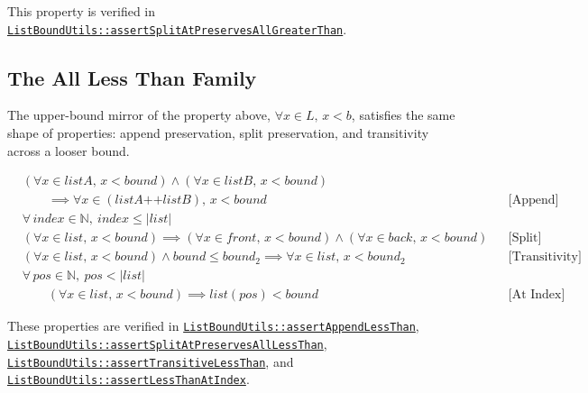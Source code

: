 {\raggedright
This property is verified in
\href{https://github.com/thiagomata/prime-numbers/blob/list-article-v1.0.0/src/main/scala/v1/chapter3/list/ListBoundUtils.scala}{\texttt{ListBoundUtils::\allowbreak assertSplitAtPreservesAllGreaterThan}}.
\par}

\subsection{The All Less Than Family}

The upper-bound mirror of the property above, $\forall x \in L,\, x < b$,
satisfies the same shape of properties: append preservation, split
preservation, and transitivity across a looser bound.

\begin{equation*}
\begin{aligned}
&(\forall x \in listA,\, x < bound) \wedge (\forall x \in listB,\, x < bound) \\
&\qquad \implies \forall x \in (listA \mathbin{\texttt{++}} listB),\, x < bound
  &&\text{[Append]} \\
&\forall\, index \in \mathbb{N},\ index \leq |list| \\
&(\forall x \in list,\, x < bound)
  \implies (\forall x \in front,\, x < bound)
     \wedge (\forall x \in back,\, x < bound)
  &&\text{[Split]} \\
&(\forall x \in list,\, x < bound) \wedge bound \leq bound_2
  \implies \forall x \in list,\, x < bound_2
  &&\text{[Transitivity]} \\
&\forall\, pos \in \mathbb{N},\ pos < |list| \\
&\qquad (\forall x \in list,\, x < bound)
  \implies list(pos) < bound
  &&\text{[At Index]}
\end{aligned}
\end{equation*}

{\raggedright
These properties are verified in
\href{https://github.com/thiagomata/prime-numbers/blob/list-article-v1.0.0/src/main/scala/v1/chapter3/list/ListBoundUtils.scala}{\texttt{ListBoundUtils::\allowbreak assertAppendLessThan}},
\href{https://github.com/thiagomata/prime-numbers/blob/list-article-v1.0.0/src/main/scala/v1/chapter3/list/ListBoundUtils.scala}{\texttt{ListBoundUtils::\allowbreak assertSplitAtPreservesAllLessThan}},
\href{https://github.com/thiagomata/prime-numbers/blob/list-article-v1.0.0/src/main/scala/v1/chapter3/list/ListBoundUtils.scala}{\texttt{ListBoundUtils::\allowbreak assertTransitiveLessThan}},
and
\href{https://github.com/thiagomata/prime-numbers/blob/list-article-v1.0.0/src/main/scala/v1/chapter3/list/ListBoundUtils.scala}{\texttt{ListBoundUtils::\allowbreak assertLessThanAtIndex}}.
\par}
